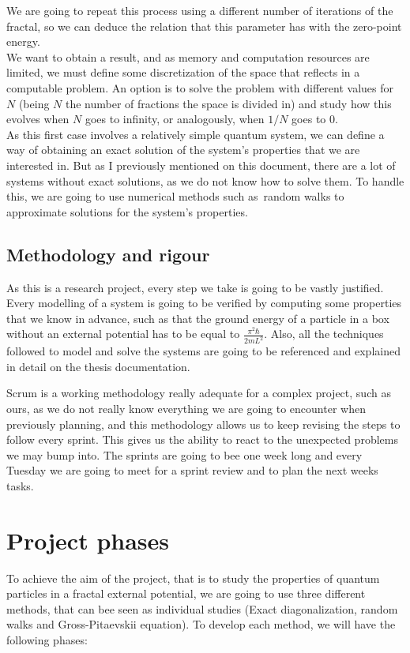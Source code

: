 \documentclass{article}
\begin{document}
We are going to repeat this process using a different number of iterations of the fractal, so we can deduce the relation that this parameter has with the zero-point energy. \\

We want to obtain a result, and as memory and computation resources are limited, we must define some discretization of the space that reflects in a computable problem. An option is to solve the problem with different values for $N$ (being $N$ the number of fractions the space is divided in) and study how this evolves when $N$ goes to infinity, or analogously, when $1/N$ goes to 0.\\

As this first case involves a relatively simple quantum system, we can define a way of obtaining an exact solution of the system's properties that we are interested in. But as I previously mentioned on this document, there are a lot of systems without exact solutions, as we do not know how to solve them. To handle this, we are going to use numerical methods such as random walks to approximate solutions for the system's properties.
\vfill
\break
\subsection{Methodology and rigour}
As this is a research project, every step we take is going to be vastly justified. Every modelling of a system is going to be verified by computing some properties that we know in advance, such as that the ground energy of a particle in a box without an external potential has to be equal to $\frac{\pi^2\hbar}{2mL^2}$. Also, all the techniques followed to model and solve the systems are going to be referenced and explained in detail on the thesis documentation. 

Scrum is a working methodology really adequate for a complex project, such as ours, as we do not really know everything we are going to encounter when previously planning, and this methodology allows us to keep revising the steps to follow every sprint. This gives us the ability to react to the unexpected problems we may bump into. The sprints are going to bee one week long and every Tuesday we are going to meet for a sprint review and to plan the next weeks tasks.

\section{Project phases}
To achieve the aim of the project, that is to study the properties of quantum particles in a fractal external potential, we are going to use three different methods, that can bee seen as individual studies (Exact diagonalization, random walks and Gross-Pitaevskii equation). To develop each method, we will have the following phases:
\end{document}
